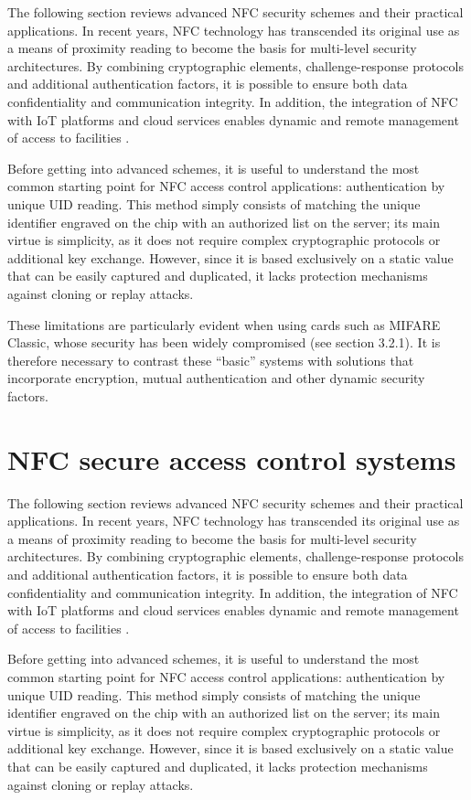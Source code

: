 The following section reviews advanced NFC security schemes and their practical applications. In recent years, NFC technology has transcended its original use as a means of proximity reading to become the basis for multi-level security architectures. By combining cryptographic elements, challenge-response protocols and additional authentication factors, it is possible to ensure both data confidentiality and communication integrity. In addition, the integration of NFC with IoT platforms and cloud services enables dynamic and remote management of access to facilities \cite{ref69}.

Before getting into advanced schemes, it is useful to understand the most common starting point for NFC access control applications: authentication by unique UID reading. This method simply consists of matching the unique identifier engraved on the chip with an authorized list on the server; its main virtue is simplicity, as it does not require complex cryptographic protocols or additional key exchange. However, since it is based exclusively on a static value that can be easily captured and duplicated, it lacks protection mechanisms against cloning or replay attacks.

These limitations are particularly evident when using cards such as MIFARE Classic, whose security has been widely compromised \cite{ref70} (see section 3.2.1). It is therefore necessary to contrast these ``basic'' systems with solutions that incorporate encryption, mutual authentication and other dynamic security factors.


\section{NFC secure access control systems}

The following section reviews advanced NFC security schemes and their practical applications. In recent years, NFC technology has transcended its original use as a means of proximity reading to become the basis for multi-level security architectures. By combining cryptographic elements, challenge-response protocols and additional authentication factors, it is possible to ensure both data confidentiality and communication integrity. In addition, the integration of NFC with IoT platforms and cloud services enables dynamic and remote management of access to facilities \cite{ref69}.

Before getting into advanced schemes, it is useful to understand the most common starting point for NFC access control applications: authentication by unique UID reading. This method simply consists of matching the unique identifier engraved on the chip with an authorized list on the server; its main virtue is simplicity, as it does not require complex cryptographic protocols or additional key exchange. However, since it is based exclusively on a static value that can be easily captured and duplicated, it lacks protection mechanisms against cloning or replay attacks.


